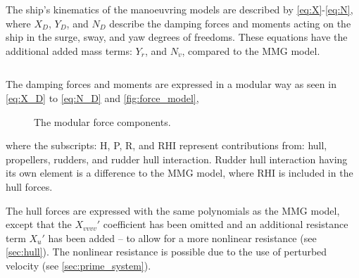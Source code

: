 The ship's kinematics of the manoeuvring models are described by \autoref{eq:X}-\autoref{eq:N}, where $X_D$, $Y_D$, and $N_D$ describe the damping forces and moments acting on the ship in the surge, sway, and yaw degrees of freedoms. These equations have the additional added mass terms: $Y_{\dot{r}}$, and $N_{\dot{v}}$, compared to the MMG model.

\begin{equation}
    \label{eq:X}
    
\end{equation}
%
\begin{equation}
    \label{eq:Y}
    
\end{equation}
%
\begin{equation}
    \label{eq:N}
    
\end{equation}

The damping forces and moments are expressed in a modular way as seen in \autoref{eq:X_D} to \autoref{eq:N_D} and \autoref{fig:force_model},
\begin{equation}
    \label{eq:X_D}
    
\end{equation}
%
\begin{equation}
    \label{eq:Y_D}
    
\end{equation}
%
\begin{equation}
    \label{eq:N_D}
    
\end{equation}
%
\begin{figure}[h]
    \centering
    
    \caption{The modular force components.}
    \label{fig:force_model}
\end{figure}
%
where the subscripts: H, P, R, and RHI represent contributions from: hull, propellers, rudders, and rudder hull interaction. Rudder hull interaction having its own element is a difference to the MMG model, where RHI is included in the hull forces.

The hull forces are expressed with the same polynomials as the MMG model, except that the ${X_{vvvv}}'$ coefficient has been omitted and an additional resistance term ${X_u}'$ has been added -- to allow for a more nonlinear resistance (see \autoref{sec:hull}). The nonlinear resistance is possible due to the use of perturbed velocity (see \autoref{sec:prime_system}).

